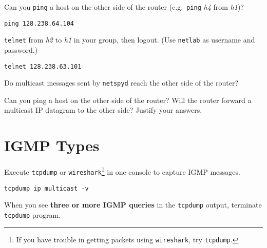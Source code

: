 \documentclass{../UTNetLab}
\begin{document}
    Can you \lstinline{ping} a host on the other side of the router (e.g.\ \lstinline{ping} \textit{h4} from \textit{h1})?

    \begin{lstlisting}
ping 128.238.64.104
    \end{lstlisting}

    \lstinline{telnet} from \textit{h2} to \textit{h1} in your group, then logout. (Use \texttt{netlab} as username and password.)

    \begin{lstlisting}
telnet 128.238.63.101
    \end{lstlisting}
    Do multicast messages sent by \lstinline{netspyd} reach the other side of the router?

    
    \begin{report}
        \item Can you ping a host on the other side of the router?
            Will the router forward a multicast IP datagram to the other side?
            Justify your answers.
    \end{report}

\section{IGMP Types}
    Execute \lstinline{tcpdump} or \lstinline{wireshark}\footnote{If you have trouble in getting packets using \lstinline{wireshark}, try \lstinline{tcpdump}.} in one console to capture IGMP messages.

    \begin{lstlisting}[emph={eth0}]
tcpdump ip multicast -v
    \end{lstlisting}
    When you see \textbf{three or more IGMP queries} in the \lstinline{tcpdump} output, terminate \lstinline{tcpdump} program.
\end{document}

